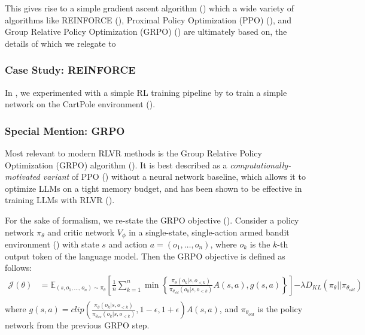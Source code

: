 \documentclass{article} %
\theoremstyle{definition}
\begin{document}
This gives rise to a simple gradient ascent algorithm (\cite{wk2}) which a wide variety of algorithms like
REINFORCE (\cite{Williams-1992}),
Proximal Policy Optimization (PPO) (\cite{ppo}),
and Group Relative Policy Optimization (GRPO) (\cite{grpo}) are ultimately based on,
the details of which we relegate to 


\subsubsection{Case Study: REINFORCE}
In \cite{wk3}, we experimented with a simple RL training pipeline by 
\cite{Levine-et-al-2023} to train a simple network on the CartPole environment (\cite{Towers-et-al-2024}).
 

\subsubsection{Special Mention: GRPO}
Most relevant to modern RLVR methods is the Group Relative Policy Optimization (GRPO) algorithm (\cite{grpo}).
It is best described as a \textit{computationally-motivated variant} of PPO (\cite{ppo}) without 
a neural network baseline, which allows it to optimize LLMs on a tight memory budget, and has
been shown to be effective in training LLMs with RLVR (\cite{grpo, r1}).

For the sake of formalism, we re-state the GRPO objective (\cite{grpo, wk10}). 
Consider a policy network $\pi_\theta$ and critic network $V_\phi$ in a single-state,
single-action armed bandit environment (\cite{Sutton-and-Barto-1998, contextualbandit}) 
with state $s$ and action $a = (o_1, \dots, o_n)$,
where $o_k$ is the $k$-th output token of the language model.
Then the GRPO objective is defined as follows:
\begin{equation}
    \label{eq:grpo-obj}
    \begin{array}{rl}
        \mathcal{J}(\theta) &= \mathbb{E}_{(s, o_1, \dots, o_n) \sim \pi_\theta} \left[ 
            \displaystyle
            \frac{1}{n} \sum_{k = 1}^n \min \left\{
                \frac{\pi_\theta(o_k|s, o_{< k})}{\pi_{\theta_{old}}(o_k|s, o_{< k})} A(s, a),
                g(s, a)
            \right\}
        \right] {\displaystyle - \lambda D_{KL}(\pi_\theta || \pi_{\theta_{old}})} \\
    \end{array}
\end{equation}
where ${\displaystyle g(s, a) = clip\left(\frac{\pi_\theta(o_k|s, o_{< k})}{\pi_{\theta_{old}}(o_k|s, o_{< k})}, 1 - \epsilon, 1 + \epsilon \right) A(s, a)}$,
and $\pi_{\theta_{old}}$ is the policy network from the previous GRPO step.
\end{document}
